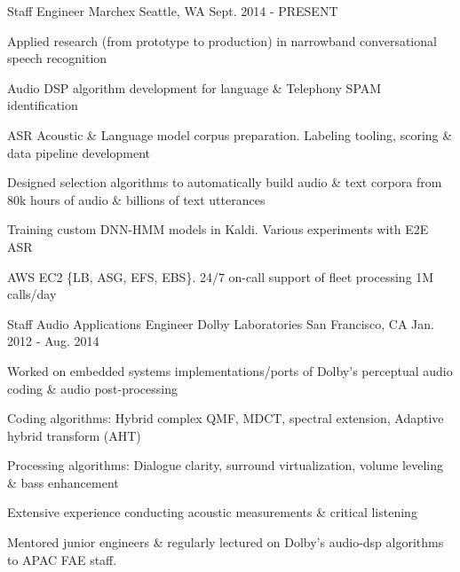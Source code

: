 

\begin{cventries}

  \cventry
    {Staff Engineer} %
    {Marchex} %
    {Seattle, WA} %
    {Sept. 2014 - PRESENT} %
    {
      \begin{cvitems} %
        \item {Applied research (from prototype to production) in narrowband conversational speech recognition}
        \item {Audio DSP algorithm development for language \& Telephony SPAM identification}
        \item {ASR Acoustic \& Language model corpus preparation. Labeling tooling, scoring \& data pipeline development}
        \item {Designed selection algorithms to automatically build audio \& text corpora from 80k hours of audio \& billions of text utterances}
        \item {Training custom DNN-HMM models in Kaldi. Various experiments with E2E ASR}
        \item {AWS EC2 \{LB, ASG, EFS, EBS\}. 24/7 on-call support of fleet processing 1M calls/day}
      \end{cvitems}
    }

  \cventry
    {Staff Audio Applications Engineer} %
    {Dolby Laboratories} %
    {San Francisco, CA} %
    {Jan. 2012 - Aug. 2014} %
    {
      \begin{cvitems} %
        \item {Worked on embedded systems implementations/ports of Dolby's perceptual audio coding \& audio post-processing}
        \item {Coding algorithms: Hybrid complex QMF, MDCT, spectral extension, Adaptive hybrid transform (AHT)}
        \item {Processing algorithms: Dialogue clarity, surround virtualization, volume leveling \& bass enhancement}
		\item {Extensive experience conducting acoustic measurements \& critical listening}
        \item {Mentored junior engineers \& regularly lectured on Dolby's audio-dsp algorithms to APAC FAE staff.}
      \end{cvitems}
    }


\end{cventries}
